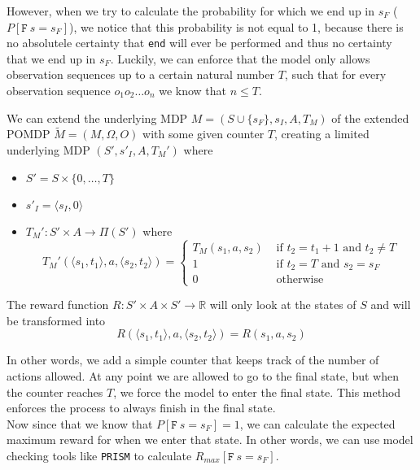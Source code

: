 \label{s:induced_limit}
However, when we try to calculate the probability for which we end up in $s_F$ ($P[ \texttt{F}\:s=s_F]$), we notice that this probability is not equal to 1, because there is no absolutele certainty that \texttt{end} will ever be performed and thus no certainty that we end up in $s_F$. Luckily, we can enforce that the model only allows observation sequences up to a certain natural number $T$, such that for every observation sequence $o_1 o_2 \dots o_n$ we know that $n\leq T$. 

\begin{definition}
We can extend the underlying MDP $M=(S\cup\{s_F\}, s_I, A, T_M)$ of the extended POMDP $\widetilde{M}=(M,\Omega,O)$ with some given counter $T$, creating a limited underlying MDP $(S',s'_I,A,T_M')$ where
\begin{itemize}
	\item $S' = S\times \{0,\dots, T\}$
	\item $s'_I = \langle s_I,0\rangle$
	\item $T_M':S'\times A \to \Pi(S')$ where 
	\[T_M'(\langle s_1,t_1\rangle,a,\langle s_2,t_2\rangle) = \begin{cases}
	T_M(s_1,a,s_2) & \text{ if } t_2 = t_1 + 1 \text{ and } t_2 \neq T\\
	1 & \text{ if } t_2 = T \text{ and } s_2 = s_F \\
	0 & \text{ otherwise }
	\end{cases}\]
\end{itemize}
\label{d:limited_pomdp}

The reward function $R:S'\times A\times S' \to \mathbb{R}$ will only look at the states of $S$ and will be transformed into
\[R(\langle s_1, t_1\rangle, a, \langle s_2, t_2\rangle) = R(s_1,a,s_2)\]
\end{definition}

In other words, we add a simple counter that keeps track of the number of actions allowed. At any point we are allowed to go to the final state, but when the counter reaches $T$, we force the model to enter the final state. This method enforces the process to always finish in the final state. \\

Now since that we know that $P[ \texttt{F}\:s=s_F]=1$, we can calculate the expected maximum reward for when we enter that state. In other words, we can use model checking tools like \texttt{PRISM} to calculate $R_{max}[\texttt{F}\:s=s_F]$.


